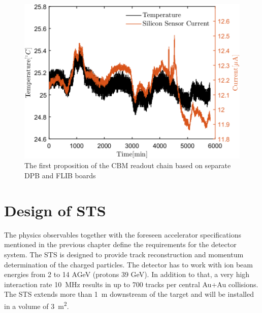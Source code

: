 \begin{figure}[!h]
\centering
\includegraphics[width=0.65\columnwidth]{Chapter2/images/currenttempnobeam.png}
\caption{The first proposition of the CBM readout chain based on separate DPB and FLIB boards \cite{CRI}}
\label{fig_leakage1}
\end{figure}




\section{Design of STS}
\label{STS}

The physics observables together with the foreseen accelerator specifications mentioned in the previous chapter define the requirements for the detector system. The \gls{STS} is designed to provide track reconstruction and momentum determination of the charged particles. The detector has to work with ion beam energies from 2 to 14 AGeV (protons 39 GeV). In addition to that, a very high interaction rate 10~MHz results in up to 700 tracks per central Au+Au collisions. The \gls{STS} extends more than \SI{1}{\metre} downstream of the target and will be installed in a volume of \SI{3}{\square\metre}. 


